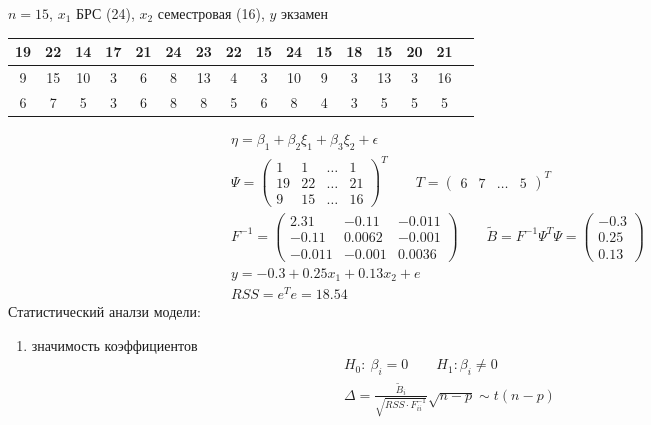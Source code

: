 \documentclass{article}
\begin{document}
\begin{eg}
  $n=15$, $x_1$ БРС (24), $x_2$ семестровая (16), $y$ экзамен
\begin{center}
\begin{tabular}{| c | c | c | c | c | c | c | c | c | c | c | c | c | c | c | c |}
  \hline
   19 & 22 & 14 & 17 & 21 & 24 & 23 & 22 & 15 & 24 & 15 & 18 & 15 & 20 & 21 \\ 
  \hline
   9 & 15 & 10 & 3 & 6 & 8 & 13 & 4 & 3 & 10 & 9 & 3 & 13 & 3 & 16 \\
  \hline
   6 & 7 & 5 & 3 & 6 & 8 & 8 & 5 & 6 & 8 & 4 & 3 & 5 & 5 & 5  \\
  \hline
\end{tabular}
\end{center}
\begin{gather*}
  \eta = \beta_1 + \beta_2 \xi_1 + \beta_3 \xi_2 + \epsilon \\ 
  \Psi = \begin{pmatrix}
    1 & 1 & \dots & 1 \\ 
    19 & 22 & \dots & 21 \\ 
    9 & 15 & \dots & 16
  \end{pmatrix}^{T} \qquad T= \begin{pmatrix}
    6 & 7 & \dots & 5
  \end{pmatrix}^{T} \\ 
  F^{-1} = \begin{pmatrix}
    2.31 & -0.11 & -0.011 \\ 
    -0.11 & 0.0 062 & -0.0 01 \\ 
    -0.011 & -0.0 01 & 0.0 0 36 
  \end{pmatrix} \qquad \tilde{B}=F^{-1}\Psi^{T}\Psi = \begin{pmatrix}
    -0.3 \\ 0.25 \\ 0.13
  \end{pmatrix} \\ 
  y = -0.3 + 0.25 x_1 + 0.13 x_2 + e \\ 
  RSS=e^{T}e =18.54
\end{gather*}
Статистический аналзи модели:
\begin{enumerate}
  \item значимость коэффициентов
    \begin{gather*}
      H_0: \: \beta_i =0 \qquad H_1: \beta_i \neq 0 \\ 
      \Delta = \frac{\tilde{B}_i}{\sqrt{RSS \cdot F^{-1}_{ii}}}\sqrt{n-p} \sim t(n-p) \\ 

\end{gather*}
\end{enumerate}
\end{eg}
\end{document}
